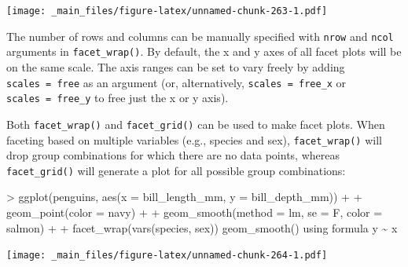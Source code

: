 \documentclass[
]{book}
\newenvironment{Shaded}{\begin{snugshade}}{\end{snugshade}}
\newcommand{\AttributeTok}[1]{\textcolor[rgb]{0.77,0.63,0.00}{#1}}
\newcommand{\FunctionTok}[1]{\textcolor[rgb]{0.00,0.00,0.00}{#1}}
\newcommand{\NormalTok}[1]{#1}
\newcommand{\SpecialCharTok}[1]{\textcolor[rgb]{0.00,0.00,0.00}{#1}}
\newcommand{\StringTok}[1]{\textcolor[rgb]{0.31,0.60,0.02}{#1}}
\begin{document}
\texttt{[image: \_main\_files/figure-latex/unnamed-chunk-263-1.pdf]}

The number of rows and columns can be manually specified with \texttt{nrow} and \texttt{ncol} arguments in \texttt{facet\_wrap()}. By default, the x and y axes of all facet plots will be on the same scale. The axis ranges can be set to vary freely by adding \texttt{scales\ =\ \textquotesingle{}free\textquotesingle{}} as an argument (or, alternatively, \texttt{scales\ =\ \textquotesingle{}free\_x\textquotesingle{}} or \texttt{scales\ =\ \textquotesingle{}free\_y\textquotesingle{}} to free just the x or y axis).

Both \texttt{facet\_wrap()} and \texttt{facet\_grid()} can be used to make facet plots. When faceting based on multiple variables (e.g., species and sex), \texttt{facet\_wrap()} will drop group combinations for which there are no data points, whereas \texttt{facet\_grid()} will generate a plot for all possible group combinations:

\begin{Shaded}
\begin{Highlighting}[]
\SpecialCharTok{\textgreater{}} \FunctionTok{ggplot}\NormalTok{(penguins, }\FunctionTok{aes}\NormalTok{(}\AttributeTok{x =}\NormalTok{ bill\_length\_mm, }\AttributeTok{y =}\NormalTok{ bill\_depth\_mm)) }\SpecialCharTok{+}
\SpecialCharTok{+}   \FunctionTok{geom\_point}\NormalTok{(}\AttributeTok{color =} \StringTok{\textquotesingle{}navy\textquotesingle{}}\NormalTok{) }\SpecialCharTok{+}
\SpecialCharTok{+}   \FunctionTok{geom\_smooth}\NormalTok{(}\AttributeTok{method =} \StringTok{\textquotesingle{}lm\textquotesingle{}}\NormalTok{, }\AttributeTok{se =}\NormalTok{ F, }\AttributeTok{color =} \StringTok{\textquotesingle{}salmon\textquotesingle{}}\NormalTok{) }\SpecialCharTok{+}
\SpecialCharTok{+}   \FunctionTok{facet\_wrap}\NormalTok{(}\FunctionTok{vars}\NormalTok{(species, sex))}
\StringTok{\textasciigrave{}}\AttributeTok{geom\_smooth()}\StringTok{\textasciigrave{}}\NormalTok{ using formula }\StringTok{\textquotesingle{}y \textasciitilde{} x\textquotesingle{}}
\end{Highlighting}
\end{Shaded}

\texttt{[image: \_main\_files/figure-latex/unnamed-chunk-264-1.pdf]}
\end{document}
